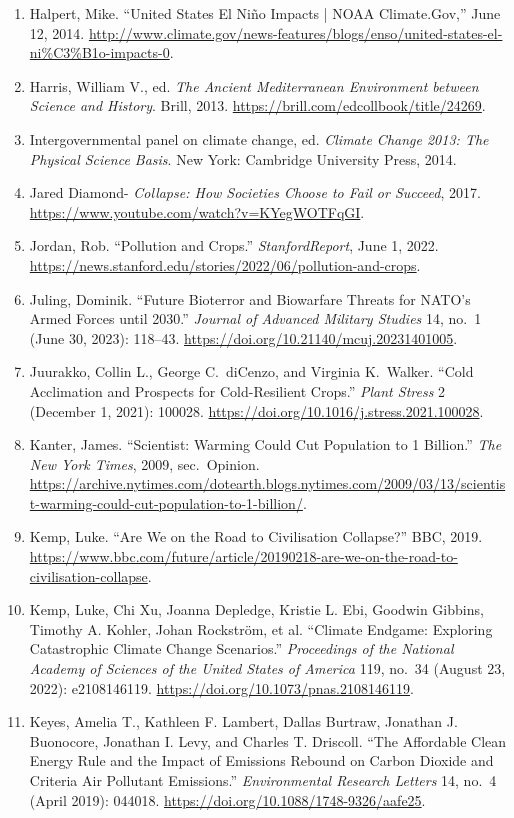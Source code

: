 \documentclass[12pt]{article}
\begin{document}
\begin{enumerate}[leftmargin=*]
\item Halpert, Mike. ``United States El Niño Impacts | NOAA Climate.Gov,'' June 12, 2014. \url{http://www.climate.gov/news-features/blogs/enso/united-states-el-ni%C3%B1o-impacts-0}.
\item Harris, William V., ed. \textit{The Ancient Mediterranean Environment between Science and History}. Brill, 2013. \url{https://brill.com/edcollbook/title/24269}.
\item Intergovernmental panel on climate change, ed. \textit{Climate Change 2013: The Physical Science Basis}. New York: Cambridge University Press, 2014.
\item Jared Diamond- \textit{Collapse: How Societies Choose to Fail or Succeed}, 2017. \url{https://www.youtube.com/watch?v=KYegWOTFqGI}.
\item Jordan, Rob. ``Pollution and Crops.'' \textit{StanfordReport}, June 1, 2022. \url{https://news.stanford.edu/stories/2022/06/pollution-and-crops}.
\item Juling, Dominik. ``Future Bioterror and Biowarfare Threats for NATO’s Armed Forces until 2030.'' \textit{Journal of Advanced Military Studies} 14, no.\ 1 (June 30, 2023): 118--43. \url{https://doi.org/10.21140/mcuj.20231401005}.
\item Juurakko, Collin L., George C.\ diCenzo, and Virginia K.\ Walker. ``Cold Acclimation and Prospects for Cold-Resilient Crops.'' \textit{Plant Stress} 2 (December 1, 2021): 100028. \url{https://doi.org/10.1016/j.stress.2021.100028}.
\item Kanter, James. ``Scientist: Warming Could Cut Population to 1 Billion.'' \textit{The New York Times}, 2009, sec.\ Opinion. \url{https://archive.nytimes.com/dotearth.blogs.nytimes.com/2009/03/13/scientist-warming-could-cut-population-to-1-billion/}.
\item Kemp, Luke. ``Are We on the Road to Civilisation Collapse?'' BBC, 2019. \url{https://www.bbc.com/future/article/20190218-are-we-on-the-road-to-civilisation-collapse}.
\item Kemp, Luke, Chi Xu, Joanna Depledge, Kristie L. Ebi, Goodwin Gibbins, Timothy A. Kohler, Johan Rockström, et al. ``Climate Endgame: Exploring Catastrophic Climate Change Scenarios.'' \textit{Proceedings of the National Academy of Sciences of the United States of America} 119, no.\ 34 (August 23, 2022): e2108146119. \url{https://doi.org/10.1073/pnas.2108146119}.
\item Keyes, Amelia T., Kathleen F. Lambert, Dallas Burtraw, Jonathan J. Buonocore, Jonathan I. Levy, and Charles T. Driscoll. ``The Affordable Clean Energy Rule and the Impact of Emissions Rebound on Carbon Dioxide and Criteria Air Pollutant Emissions.'' \textit{Environmental Research Letters} 14, no.\ 4 (April 2019): 044018. \url{https://doi.org/10.1088/1748-9326/aafe25}.

\end{enumerate}
\end{document}
